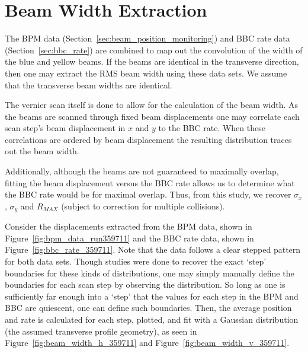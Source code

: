 \clearpage
\section{Beam Width Extraction}
\label{sec:beam_width}

The BPM data (Section~\ref{sec:beam_position_monitoring}) and BBC rate data
(Section~\ref{sec:bbc_rate}) are combined to map out the convolution of the
width of the blue and yellow beams. If the beams are identical in the transverse
direction, then one may extract the RMS beam width using these data sets. We
assume that the transverse beam widths are identical.

The vernier scan itself is done to allow for the calculation of the beam width.
As the beams are scanned through fixed beam displacements one may correlate each
scan step's beam displacement in $x$ and $y$ to the BBC rate. When these
correlations are ordered by beam displacement the resulting distribution traces
out the beam width. 

Additionally, although the beams are not guaranteed to maximally overlap,
fitting the beam displacement versus the BBC rate allows us to determine what
the BBC rate would be for maximal overlap. Thus, from this study, we recover
$\sigma_{x}$, $\sigma_{y}$ and $R_{MAX}$ (subject to correction for multiple
collisions).

Consider the displacements extracted from the BPM data, shown in
Figure~\ref{fig:bpm_data_run359711} and the BBC rate data, shown in
Figure~\ref{fig:bbc_rate_359711}. Note that the data follows a clear stepped
pattern for both data sets. Though studies were done to recover the exact `step'
boundaries for these kinds of distributions, one may simply manually define the
boundaries for each scan step by observing the distribution. So long as one is
sufficiently far enough into a `step' that the values for each step in the BPM
and BBC are quiescent, one can define such boundaries. Then, the average
position and rate is calculated for each step, plotted, and fit with a Gaussian
distribution (the assumed transverse profile geometry), as seen in
Figure~\ref{fig:beam_width_h_359711} and Figure~\ref{fig:beam_width_v_359711}.

